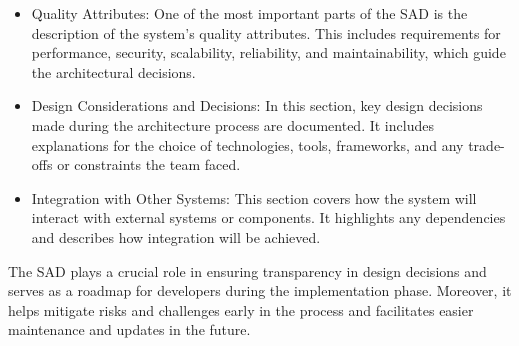 \documentclass[a4paper, 10pt]{book}
\begin{document}
\begin{itemize}
                \item {\bold Quality Attributes:} One of the most important parts of the SAD is the description of the system's quality attributes. This includes requirements for performance, security, scalability, reliability, and maintainability, which guide the architectural decisions.

                \item {\bold Design Considerations and Decisions:} In this section, key design decisions made during the architecture process are documented. It includes explanations for the choice of technologies, tools, frameworks, and any trade-offs or constraints the team faced.

                \item {\bold Integration with Other Systems:} This section covers how the system will interact with external systems or components. It highlights any dependencies and describes how integration will be achieved.

            \end{itemize}

            The SAD plays a crucial role in ensuring transparency in design decisions and serves as a roadmap for developers during the implementation phase. Moreover, it helps mitigate risks and challenges early in the process and facilitates easier maintenance and updates in the future.

            
\end{document}
